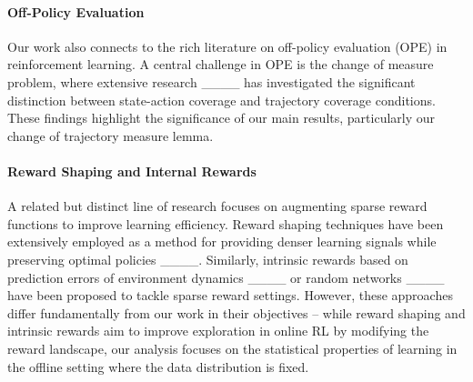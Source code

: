 \paragraph{Off-Policy Evaluation}
Our work also connects to the rich literature on off-policy evaluation (OPE) in reinforcement learning. A central challenge in OPE is the change of measure problem, where extensive research ____ has investigated the significant distinction between state-action coverage and trajectory coverage conditions. These findings highlight the significance of our main results, particularly our change of trajectory measure lemma.


\paragraph{Reward Shaping and Internal Rewards}
A related but distinct line of research focuses on augmenting sparse reward functions to improve learning efficiency. Reward shaping techniques have been extensively employed as a method for providing denser learning signals while preserving optimal policies ____. Similarly, intrinsic rewards based on prediction errors of environment dynamics ____ or random networks ____ have been proposed to tackle sparse reward settings. However, these approaches differ fundamentally from our work in their objectives -- while reward shaping and intrinsic rewards aim to improve exploration in online RL by modifying the reward landscape, our analysis focuses on the statistical properties of learning in the offline setting where the data distribution is fixed.